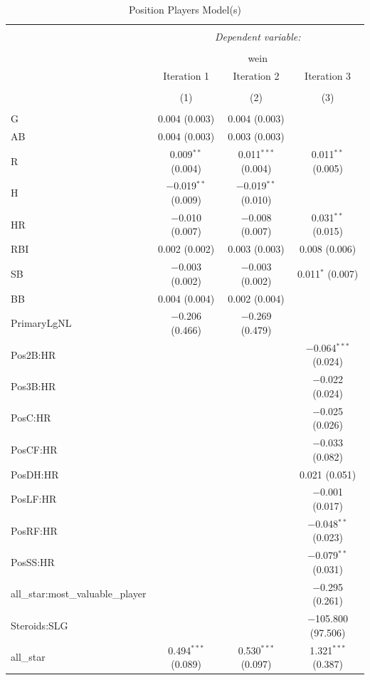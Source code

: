 \documentclass[
]{article}
\begin{document}
\begin{table}[H] \centering 
  \caption{Position Players Model(s)} 
  \label{} 
\tiny 
\begin{tabular}{@{\extracolsep{5pt}}lccc} 
\\[-1.8ex]\hline 
\hline \\[-1.8ex] 
 & \multicolumn{3}{c}{\textit{Dependent variable:}} \\ 
\cline{2-4} 
\\[-1.8ex] & \multicolumn{3}{c}{wein} \\ 
 & Iteration 1 & Iteration 2 & Iteration 3 \\ 
\\[-1.8ex] & (1) & (2) & (3)\\ 
\hline \\[-1.8ex] 
 G & 0.004 (0.003) & 0.004 (0.003) &  \\ 
  AB & 0.004 (0.003) & 0.003 (0.003) &  \\ 
  R & 0.009$^{**}$ (0.004) & 0.011$^{***}$ (0.004) & 0.011$^{**}$ (0.005) \\ 
  H & $-$0.019$^{**}$ (0.009) & $-$0.019$^{**}$ (0.010) &  \\ 
  HR & $-$0.010 (0.007) & $-$0.008 (0.007) & 0.031$^{**}$ (0.015) \\ 
  RBI & 0.002 (0.002) & 0.003 (0.003) & 0.008 (0.006) \\ 
  SB & $-$0.003 (0.002) & $-$0.003 (0.002) & 0.011$^{*}$ (0.007) \\ 
  BB & 0.004 (0.004) & 0.002 (0.004) &  \\ 
  PrimaryLgNL & $-$0.206 (0.466) & $-$0.269 (0.479) &  \\ 
  Pos2B:HR &  &  & $-$0.064$^{***}$ (0.024) \\ 
  Pos3B:HR &  &  & $-$0.022 (0.024) \\ 
  PosC:HR &  &  & $-$0.025 (0.026) \\ 
  PosCF:HR &  &  & $-$0.033 (0.082) \\ 
  PosDH:HR &  &  & 0.021 (0.051) \\ 
  PosLF:HR &  &  & $-$0.001 (0.017) \\ 
  PosRF:HR &  &  & $-$0.048$^{**}$ (0.023) \\ 
  PosSS:HR &  &  & $-$0.079$^{**}$ (0.031) \\ 
  all\_star:most\_valuable\_player &  &  & $-$0.295 (0.261) \\ 
  Steroids:SLG &  &  & $-$105.800 (97.506) \\ 
  all\_star & 0.494$^{***}$ (0.089) & 0.530$^{***}$ (0.097) & 1.321$^{***}$ (0.387) \\ 

\end{tabular}
\end{table}
\end{document}
